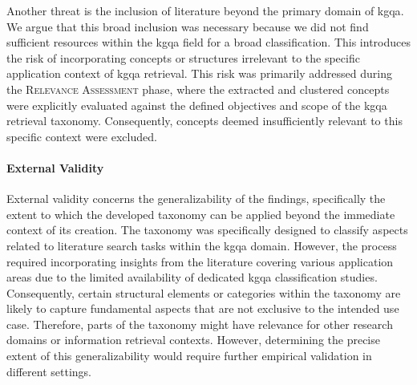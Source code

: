 Another threat is the inclusion of literature beyond the primary domain of \gls{kgqa}. We argue that this broad inclusion was necessary because we did not find sufficient resources within the \gls{kgqa} field for a broad classification. This introduces the risk of incorporating concepts or structures irrelevant to the specific application context of \gls{kgqa} retrieval. This risk was primarily addressed during the \textsc{Relevance Assessment} phase, where the extracted and clustered concepts were explicitly evaluated against the defined objectives and scope of the \gls{kgqa} retrieval taxonomy. Consequently, concepts deemed insufficiently relevant to this specific context were excluded.


\paragraph{External Validity}
External validity concerns the generalizability of the findings, specifically the extent to which the developed taxonomy can be applied beyond the immediate context of its creation. The taxonomy was specifically designed to classify aspects related to literature search tasks within the \gls{kgqa} domain. However, the process required incorporating insights from the literature covering various application areas due to the limited availability of dedicated \gls{kgqa} classification studies. Consequently, certain structural elements or categories within the taxonomy are likely to capture fundamental aspects that are not exclusive to the intended use case. Therefore, parts of the taxonomy might have relevance for other research domains or information retrieval contexts. However, determining the precise extent of this generalizability would require further empirical validation in different settings.

